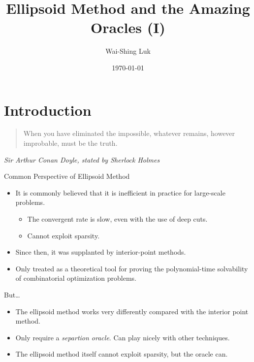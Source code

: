 \documentclass[
  ignorenonframetext,
  aspectratio=169,
  serif,onlymath]{beamer}
\title{Ellipsoid Method and the Amazing Oracles (I)}
\author{Wai-Shing Luk}
\date{\today}
\institute{Fudan University}
\begin{document}
\frame{\titlepage}

\begin{frame}
  \tableofcontents[hideallsubsections]
\end{frame}
\hypertarget{introduction}{%
\section{Introduction}\label{introduction}}

\begin{frame}

\begin{quote}
When you have eliminated the impossible, whatever remains, however
improbable, must be the truth.
\end{quote}

\emph{Sir Arthur Conan Doyle, stated by Sherlock Holmes}

\end{frame}

\begin{frame}{Common Perspective of Ellipsoid Method}
\protect\hypertarget{common-perspective-of-ellipsoid-method}{}

\begin{itemize}
\item
  It is commonly believed that it is inefficient in practice for
  large-scale problems.

  \begin{itemize}
  \item
    The convergent rate is slow, even with the use of deep cuts.
  \item
    Cannot exploit sparsity.
  \end{itemize}
\item
  Since then, it was supplanted by interior-point methods.
\item
  Only treated as a theoretical tool for proving the polynomial-time
  solvability of combinatorial optimization problems.
\end{itemize}

\end{frame}

\begin{frame}{But\ldots{}}
\protect\hypertarget{but}{}

\begin{itemize}
\item
  The ellipsoid method works very differently compared with the interior
  point method.
\item
  Only require a \emph{separtion oracle}. Can play nicely with other
  techniques.
\item
  The ellipsoid method itself cannot exploit sparsity, but the oracle
  can.
\end{itemize}

\end{frame}
\end{document}
